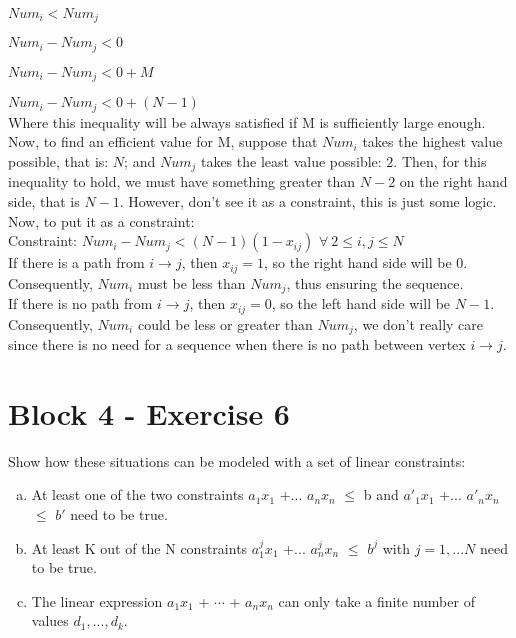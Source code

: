 \documentclass[11pt, oneside]{article}   	%
\begin{document}
$Num_i < Num_j$

$Num_i - Num_j < 0$

$Num_i - Num_j < 0 + M$

$Num_i - Num_j < 0 + (N - 1)$\\


Where this inequality will be always satisfied if M is sufficiently large enough. Now, to find an efficient value for M, suppose that $Num_i$ takes the highest value possible, that is: $N$; and $Num_j$ takes the least value possible: $2$. Then, for this inequality to hold, we must have something greater than $N - 2$ on the right hand side, that is $N - 1$. However, don't see it as a constraint, this is just some logic. Now, to put it as a constraint:\\

Constraint: $Num_i - Num_j < (N - 1)(1 - x_{ij})$ \hspace{5 mm} $\forall{}\ 2 \leq i,j \leq N$\\

If there is a path from $i \rightarrow j$, then $x_{ij} = 1$, so the right hand side will be $0$. Consequently, $Num_i$ must be less than $Num_j$, thus ensuring the sequence.\\

If there is no path  from $i \rightarrow j$, then $x_{ij} = 0$, so the left hand side will be $N - 1$. Consequently, $Num_i$ could be less or greater than $Num_j$, we don't really care since there is no need for a sequence when there is no path between vertex $i \rightarrow j$.\\

\section{Block 4 - Exercise 6}

Show how these situations can be modeled with a set of linear constraints:

\begin{enumerate}[(a)]
  \item At least one of the two constraints $a_1$$x_1$ +... $a_n$$x_n$ $\leq$ b and $a'_1$$x_1$ +... $a'_n$$x_n$ $\leq$ $b'$ need to be true.
  \item At least K out of the N constraints  $a^j_1$$x_1$ +... $a^j_n$$x_n$ $\leq$ $b^j$ with $j = 1,...N$ need to be true.
  \item The linear expression $a_1$$x_1$ + $\cdots$ + $a_n$$x_n$ can only take a finite number of values $d_1, . . . , d_k$.
\end{enumerate}
\end{document}
